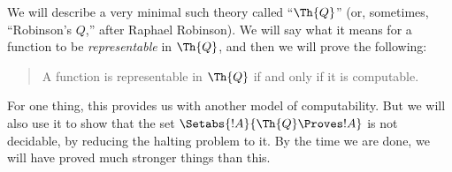 \documentclass[../../include/open-logic-section]{subfiles}
\begin{document}

We will describe a very minimal such theory called ``$\Th{Q}$'' (or,
sometimes, ``Robinson's $Q$,'' after Raphael Robinson). We will say
what it means for a function to be \emph{representable} in $\Th{Q}$, and
then we will prove the following:
\begin{quote}
  A function is representable in $\Th{Q}$ if and only if it is computable.
\end{quote}
For one thing, this provides us with another model of
computability. But we will also use it to show that the set
$\Setabs{!A}{\Th{Q} \Proves !A}$ is not decidable, by reducing the
halting problem to it. By the time we are done, we will have proved
much stronger things than this.
\end{document}
